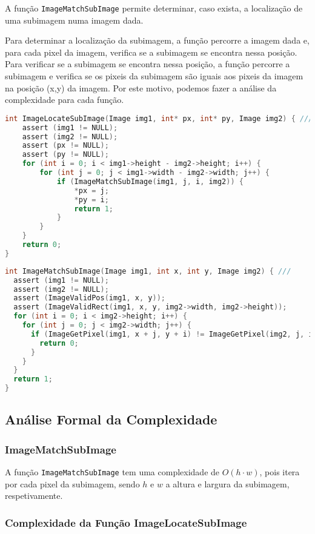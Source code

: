 \documentclass{report}
\begin{document}
A função \texttt{ImageMatchSubImage} permite determinar, caso exista, a localização de uma subimagem numa imagem dada.
\par
Para determinar a localização da subimagem, a função percorre a imagem dada e, para cada pixel da imagem, verifica se a subimagem se encontra nessa posição. 
Para verificar se a subimagem se encontra nessa posição, a função percorre a subimagem e verifica se os pixeis da subimagem são iguais aos pixeis da imagem na posição (x,y) da imagem.
Por este motivo, podemos fazer a análise da complexidade para cada função.
\par
\begingroup
\begin{lstlisting}[language=C]
int ImageLocateSubImage(Image img1, int* px, int* py, Image img2) { ///
    assert (img1 != NULL);
    assert (img2 != NULL);
    assert (px != NULL);
    assert (py != NULL);
    for (int i = 0; i < img1->height - img2->height; i++) {
        for (int j = 0; j < img1->width - img2->width; j++) {
            if (ImageMatchSubImage(img1, j, i, img2)) {
                *px = j;
                *py = i;
                return 1;
            }
        }
    }
    return 0;
}
\end{lstlisting}
    
\begin{lstlisting}[language=C]
int ImageMatchSubImage(Image img1, int x, int y, Image img2) { ///
  assert (img1 != NULL);
  assert (img2 != NULL);
  assert (ImageValidPos(img1, x, y));
  assert (ImageValidRect(img1, x, y, img2->width, img2->height));
  for (int i = 0; i < img2->height; i++) {
    for (int j = 0; j < img2->width; j++) {
      if (ImageGetPixel(img1, x + j, y + i) != ImageGetPixel(img2, j, i)) {
        return 0;
      }
    }
  }
  return 1;
}
\end{lstlisting}
\endgroup

\subsection{Análise Formal da Complexidade}

\subsubsection*{ImageMatchSubImage}
A função \texttt{ImageMatchSubImage} tem uma complexidade de \(O(h \cdot w)\), pois itera por cada pixel da subimagem, 
sendo \(h\) e \(w\) a altura e largura da subimagem, respetivamente.

\subsubsection{Complexidade da Função ImageLocateSubImage}
\end{document}
